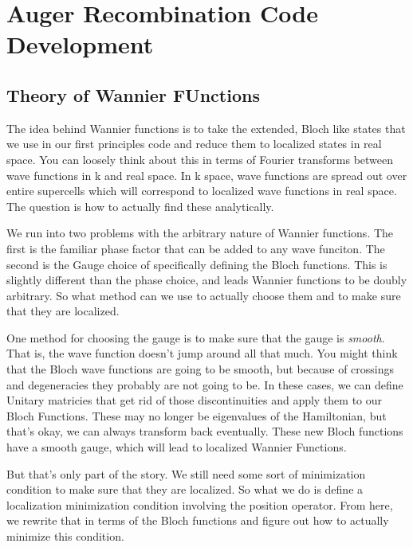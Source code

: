
\section{Auger Recombination Code Development}\label{chapter:code}

\subsection{Theory of Wannier
FUnctions}\label{theory-of-wannier-functions}

The idea behind Wannier functions is to take the extended, Bloch like
states that we use in our first principles code and reduce them to
localized states in real space. You can loosely think about this in
terms of Fourier transforms between wave functions in k and real space.
In k space, wave functions are spread out over entire supercells which
will correspond to localized wave functions in real space. The question
is how to actually find these analytically.

We run into two problems with the arbitrary nature of Wannier functions.
The first is the familiar phase factor that can be added to any wave
funciton. The second is the Gauge choice of specifically defining the
Bloch functions. This is slightly different than the phase choice, and
leads Wannier functions to be doubly arbitrary. So what method can we
use to actually choose them and to make sure that they are localized.

One method for choosing the gauge is to make sure that the gauge is
\emph{smooth}. That is, the wave function doesn't jump around all that
much. You might think that the Bloch wave functions are going to be
smooth, but because of crossings and degeneracies they probably are not
going to be. In these cases, we can define Unitary matricies that get
rid of those discontinuities and apply them to our Bloch Functions.
These may no longer be eigenvalues of the Hamiltonian, but that's okay,
we can always transform back eventually. These new Bloch functions have
a smooth gauge, which will lead to localized Wannier Functions.

But that's only part of the story. We still need some sort of
minimization condition to make sure that they are localized. So what we
do is define a localization minimization condition involving the
position operator. From here, we rewrite that in terms of the Bloch
functions and figure out how to actually minimize this condition.

